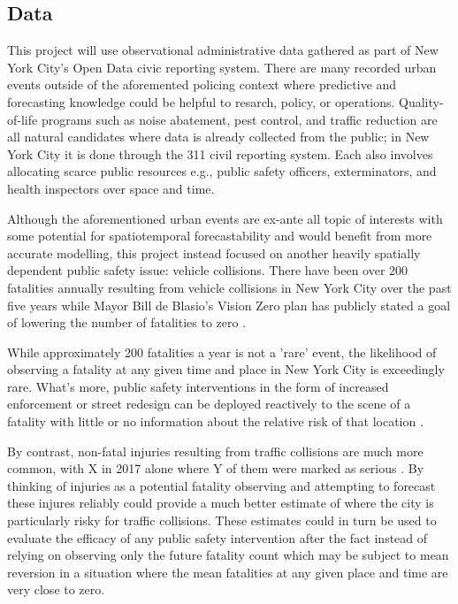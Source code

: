 \subsection{Data}

This project will use observational administrative data gathered as part of New York City's Open Data civic reporting system. There are many recorded urban events outside of the aforemented policing context where predictive and forecasting knowledge could be helpful to resarch, policy, or operations. Quality-of-life programs such as noise abatement, pest control, and traffic reduction are all natural candidates where data is already collected from the public; in New York City it is done through the 311 civil reporting system. Each also involves allocating scarce public resources e.g., public safety officers, exterminators, and health inspectors over space and time. \par

Although the aforementioned urban events are ex-ante all topic of interests with some potential for spatiotemporal forecastability and would benefit from more accurate modelling, this project instead focused on another heavily spatially dependent public safety issue: vehicle collisions. There have been over 200 fatalities annually resulting from vehicle collisions in New York City over the past five years while Mayor Bill de Blasio's Vision Zero plan has publicly stated a goal of lowering the number of fatalities to zero \cite{nyc_vz}. \par

While approximately 200 fatalities a year is not a 'rare' event, the likelihood of observing a fatality at any given time and place in New York City is exceedingly rare. What's more, public safety interventions in the form of increased enforcement or street redesign can be deployed reactively to the scene of a fatality with little or no information about the relative risk of that location . \par

By contrast, non-fatal injuries resulting from traffic collisions are much more common, with X in 2017 alone where Y of them were marked as serious . By thinking of injuries as a potential fatality observing and attempting to forecast these injures reliably could provide a much better estimate of where the city is particularly risky for traffic collisions. These estimates could in turn be used to evaluate the efficacy of any public safety intervention after the fact instead of relying on observing only the future fatality count which may be subject to mean reversion in a situation where the mean fatalities at any given place and time are very close to zero.


